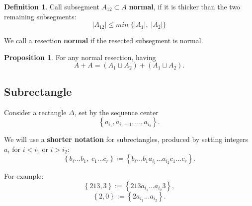 \documentclass[a4paper, 12pt]{article}
\theoremstyle{definition}
\newtheorem*{definition}{Definition}
\theoremstyle{definition}
\theoremstyle{proposition}
\newtheorem*{proposition}{Proposition}
\theoremstyle{lemma}
\newcommand{\D}{\Delta}
\begin{document}

\begin{definition}
	Call subsegment $A_{12} \subset A$ \textbf{normal}, if it is thicker than the two remaining subsegments:
	\begin{equation}
		\label{normal_resection}
		|A_{12}| \leqslant min\;\{|A_1|,\; |A_2|\}
	\end{equation}
\end{definition}

We call a resection \textbf{normal} if the resected subsegment is normal.

\begin{proposition}
	For any normal resection, having
	\begin{equation}
		\label{sum_is_present}
		A + A = (A_1 \sqcup A_2) + (A_1 \sqcup A_2).
	\end{equation}
\end{proposition}




\subsection{Subrectangle}
Consider a rectangle $\D$, set by the sequence center
\begin{equation*}
	\left\{ a_{i_1}, a_{i_1 + 1}, ..., a_{i_2} \right\}.
\end{equation*}

We will use a \textbf{shorter notation} for subrectangles, produced by setting integers
$a_i$ for $i < i_1$ or $i > i_2$:
\begin{equation*}
	\left\{ b_\ell...b_1,\; c_1...c_r\right\} \coloneqq
	\left\{ b_\ell...b_1 a_{i_1} ... a_{i_2} c_1...c_r\right\}.
\end{equation*}

For example:
\begin{equation}\tag{ex.1}\label{subrectangle_ex1}
	\left\{213, 3\right\} := \left\{ 213 a_{i_1} ... a_{i_2} 3\right\},
\end{equation}
\begin{equation}\tag{ex.2}\label{subrectangle_ex2}
	\left\{2, 0\right\} := \left\{ 2 a_{i_1} ... a_{i_2}  \right\}.
\end{equation}
\end{document}

